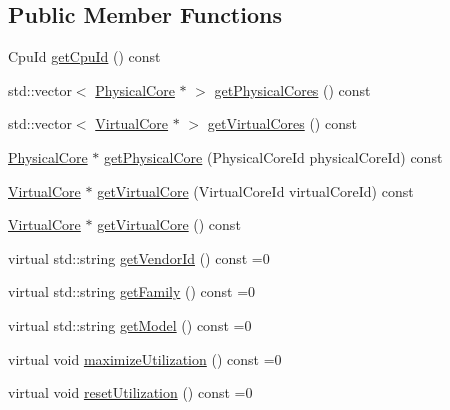 \subsection*{Public Member Functions}
\begin{DoxyCompactItemize}
\item 
Cpu\-Id \hyperlink{classmammut_1_1topology_1_1Cpu_ab8f01a27491ad5bc899e99374279ae12}{get\-Cpu\-Id} () const 
\item 
std\-::vector$<$ \hyperlink{classmammut_1_1topology_1_1PhysicalCore}{Physical\-Core} $\ast$ $>$ \hyperlink{classmammut_1_1topology_1_1Cpu_a25fbc331fe90d9153b3d49df76cd18e0}{get\-Physical\-Cores} () const 
\item 
std\-::vector$<$ \hyperlink{classmammut_1_1topology_1_1VirtualCore}{Virtual\-Core} $\ast$ $>$ \hyperlink{classmammut_1_1topology_1_1Cpu_a3b79c5d3a7b1173abf92719d86a6e72a}{get\-Virtual\-Cores} () const 
\item 
\hyperlink{classmammut_1_1topology_1_1PhysicalCore}{Physical\-Core} $\ast$ \hyperlink{classmammut_1_1topology_1_1Cpu_aec31e3b1a9a6a34dc8413e5ede679525}{get\-Physical\-Core} (Physical\-Core\-Id physical\-Core\-Id) const 
\item 
\hyperlink{classmammut_1_1topology_1_1VirtualCore}{Virtual\-Core} $\ast$ \hyperlink{classmammut_1_1topology_1_1Cpu_a0155129f705cb026e4ce62fdae831a7d}{get\-Virtual\-Core} (Virtual\-Core\-Id virtual\-Core\-Id) const 
\item 
\hyperlink{classmammut_1_1topology_1_1VirtualCore}{Virtual\-Core} $\ast$ \hyperlink{classmammut_1_1topology_1_1Cpu_ad37f4a4ca3522a55da403ff6ffca4cf2}{get\-Virtual\-Core} () const 
\item 
virtual std\-::string \hyperlink{classmammut_1_1topology_1_1Cpu_a7b1fcfcc8df09588832ca1dc6351e6f1}{get\-Vendor\-Id} () const =0
\item 
virtual std\-::string \hyperlink{classmammut_1_1topology_1_1Cpu_a14f0984b504c0c207250829728193f8c}{get\-Family} () const =0
\item 
virtual std\-::string \hyperlink{classmammut_1_1topology_1_1Cpu_a6e98555afbc9d4985acc4ec30fbc5d96}{get\-Model} () const =0
\item 
virtual void \hyperlink{classmammut_1_1topology_1_1Cpu_a249829ade28b8fffcda1d2666cf68997}{maximize\-Utilization} () const =0
\item 
virtual void \hyperlink{classmammut_1_1topology_1_1Cpu_a3eea41d7ad6200d83301102f23944de5}{reset\-Utilization} () const =0
\end{DoxyCompactItemize}
